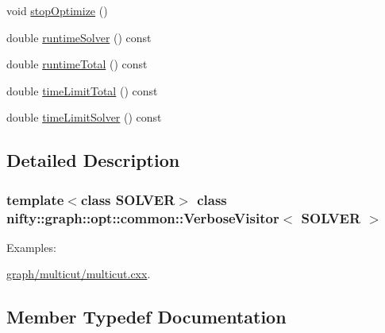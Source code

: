 \begin{DoxyCompactItemize}
\item 
void \hyperlink{classnifty_1_1graph_1_1opt_1_1common_1_1VerboseVisitor_ad723638f9bc640bf6ee2db68e59840d4}{stop\+Optimize} ()
\item 
double \hyperlink{classnifty_1_1graph_1_1opt_1_1common_1_1VerboseVisitor_ac4d88a68c144e0dd15b47dac8275866e}{runtime\+Solver} () const
\item 
double \hyperlink{classnifty_1_1graph_1_1opt_1_1common_1_1VerboseVisitor_af51c8a2e3b5b5bd9f873a748bfa99240}{runtime\+Total} () const
\item 
double \hyperlink{classnifty_1_1graph_1_1opt_1_1common_1_1VerboseVisitor_a60babdee8b9daa8f48f43dc6bab8c5c0}{time\+Limit\+Total} () const
\item 
double \hyperlink{classnifty_1_1graph_1_1opt_1_1common_1_1VerboseVisitor_a84b59607c8922f5be67b21e08adc9b5d}{time\+Limit\+Solver} () const
\end{DoxyCompactItemize}


\subsection{Detailed Description}
\subsubsection*{template$<$class S\+O\+L\+V\+ER$>$\newline
class nifty\+::graph\+::opt\+::common\+::\+Verbose\+Visitor$<$ S\+O\+L\+V\+E\+R $>$}

\begin{Desc}
\item[Examples\+: ]\par
\hyperlink{graph_2multicut_2multicut_8cxx-example}{graph/multicut/multicut.\+cxx}.\end{Desc}


\subsection{Member Typedef Documentation}
\mbox{\label{classnifty_1_1graph_1_1opt_1_1common_1_1VerboseVisitor_ae29f33f171913b9a2ced7adb9da4dc1d}} 
